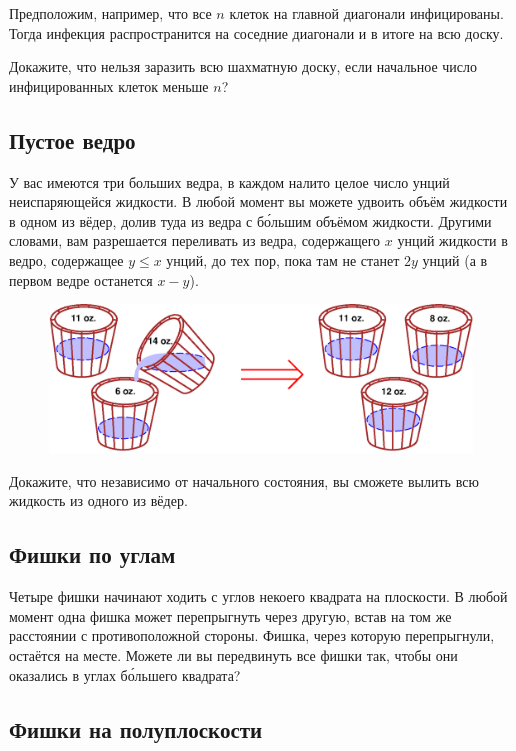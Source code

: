 Предположим, например, что все $n$ клеток на главной диагонали инфицированы.
Тогда инфекция распространится на соседние диагонали и в итоге на всю доску.

Докажите, что нельзя заразить всю шахматную доску, если начальное число инфицированных клеток меньше $n$?

\subsection*{Пустое ведро}%

У вас имеются три больших ведра, в каждом налито целое число унций неиспаряющейся жидкости.
В любой момент вы можете удвоить объём жидкости в одном из вёдер, долив туда из ведра с б\'{о}льшим объёмом жидкости.
Другими словами, вам разрешается переливать из ведра, содержащего $x$ унций жидкости в ведро, содержащее 
$y\le x$ унций, до тех пор, пока там не станет $2y$ унций (а в первом ведре останется $x-y$).

\begin{figure}[h!]
\centering
\includegraphics[scale=0.6]{Figs/Algorithms/buckets}
\end{figure}

Докажите, что независимо от начального состояния, вы сможете вылить всю жидкость из одного из вёдер.

\subsection*{Фишки по углам}%

Четыре фишки начинают ходить с углов некоего квадрата на плоскости.
В любой момент одна фишка может перепрыгнуть через другую,
встав на том же расстоянии с противоположной стороны.
Фишка, через которую перепрыгнули, остаётся на месте.
Можете ли вы передвинуть все фишки так, чтобы они оказались в углах б\'{о}льшего квадрата?

\subsection*{Фишки на полуплоскости}%

